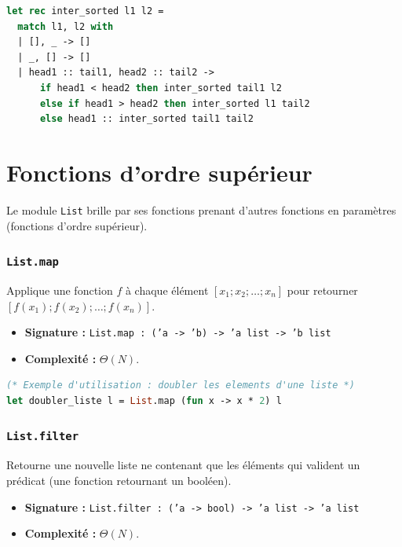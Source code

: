 \documentclass{article}
\begin{document}

    
\begin{lstlisting}[language=Caml]
let rec inter_sorted l1 l2 =
  match l1, l2 with
  | [], _ -> []
  | _, [] -> []
  | head1 :: tail1, head2 :: tail2 ->
      if head1 < head2 then inter_sorted tail1 l2
      else if head1 > head2 then inter_sorted l1 tail2
      else head1 :: inter_sorted tail1 tail2
\end{lstlisting}


\section{Fonctions d'ordre supérieur}

Le module \texttt{List} brille par ses fonctions prenant d'autres fonctions en paramètres (fonctions d'ordre supérieur).

\subsubsection{\texttt{List.map}}
Applique une fonction $f$ à chaque élément $[x_1; x_2; \dots; x_n]$ pour retourner $[f(x_1); f(x_2); \dots; f(x_n)]$.
\begin{itemize}
    \item \textbf{Signature :} \texttt{List.map : ('a -> 'b) -> 'a list -> 'b list}
    \item \textbf{Complexité :} $\Theta(N)$.
\end{itemize}

\begin{lstlisting}[language=Caml]
(* Exemple d'utilisation : doubler les elements d'une liste *)
let doubler_liste l = List.map (fun x -> x * 2) l
\end{lstlisting}

\subsubsection{\texttt{List.filter}}
Retourne une nouvelle liste ne contenant que les éléments qui valident un prédicat (une fonction retournant un booléen).
\begin{itemize}
    \item \textbf{Signature :} \texttt{List.filter : ('a -> bool) -> 'a list -> 'a list}
    \item \textbf{Complexité :} $\Theta(N)$.
\end{itemize}
\end{document}
